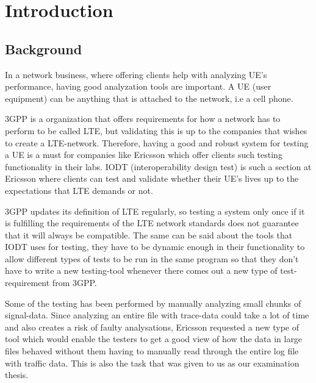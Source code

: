 \documentclass[cropmarks, frame, english]{idamasterthesis}
\begin{document}
\chapter{Introduction} %
\section{Background}

In a network business, where offering clients help with analyzing UE's performance, having good analyzation tools are important. A UE (user equipment) can be anything that is attached to the network, i.e a cell phone. 

3GPP is a organization that offers requirements for how a network has to perform to be called LTE, but validating this is up to the companies that wishes to create a LTE-network. Therefore, having a good and robust system for testing a UE is a must for companies like Ericsson which offer clients such testing functionality in their labs.
IODT (interoperability design test) is such a section at Ericsson where clients can test and validate whether their UE's lives up to the expectations that LTE demands or not.

3GPP updates its definition of LTE regularly, so testing a system only once if it is fulfilling the requirements of the LTE network standards does not guarantee that it will always be compatible. The same can be said about the tools that IODT uses for testing, they have to be dynamic enough in their functionality to allow different types of tests to be run in the same program so that they don't have to write a new testing-tool whenever there comes out a new type of test-requirement from 3GPP.

Some of the testing has been performed by manually analyzing small chunks of signal-data. Since analyzing an entire file with trace-data could take a lot of time and also creates a risk of faulty analysations, Ericsson requested a new type of tool which would enable the testers to get a good view of how the data in large files behaved without them having to manually read through the entire log file with traffic data. This is also the task that was given to us as our examination thesis.
\newpage
\end{document}
